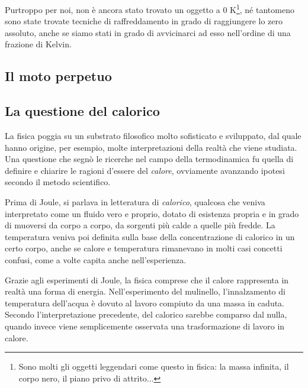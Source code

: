 Purtroppo per noi, non è ancora stato trovato un oggetto a 0 K\footnote{Sono
molti gli oggetti leggendari come questo in fisica: la massa infinita, il
corpo nero, il piano privo di attrito...}, né tantomeno sono state
trovate tecniche di raffreddamento in grado di raggiungere lo zero
assoluto, anche se siamo stati in grado di avvicinarci ad esso
nell'ordine di una frazione di Kelvin.

\subsection{Il moto perpetuo}


\subsection{La questione del calorico}
La fisica poggia su un substrato filosofico molto sofisticato e
sviluppato, dal quale hanno origine, per esempio, molte interpretazioni
della realtà che viene studiata. Una questione che segnò le ricerche
nel campo della termodinamica fu quella di definire e chiarire le
ragioni d'essere del \textit{calore}, ovviamente avanzando ipotesi
secondo il metodo scientifico.

Prima di Joule, si parlava in letteratura di \textit{calorico},
qualcosa che veniva interpretato come un fluido vero e proprio,
dotato di esistenza propria e in grado di muoversi da corpo a
corpo, da sorgenti più calde a quelle più fredde. La temperatura
veniva poi definita sulla base della concentrazione di calorico
in un certo corpo, anche se calore e temperatura rimanevano in
molti casi concetti confusi, come a volte capita anche nell'esperienza.

Grazie agli esperimenti di Joule, la fisica comprese che il calore
rappresenta in realtà una forma di energia. Nell'esperimento del
mulinello, l'innalzamento di temperatura dell'acqua è dovuto al
lavoro compiuto da una massa in caduta. Secondo l'interpretazione
precedente, del calorico sarebbe comparso dal nulla, quando invece
viene semplicemente osservata una trasformazione di lavoro in calore.
